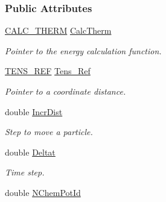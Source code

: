 \subsubsection*{Public Attributes}
\begin{DoxyCompactItemize}
\item 
\hyperlink{classForces_a287767d0d121df9d18211f05b84b692d}{C\+A\+L\+C\+\_\+\+T\+H\+E\+RM} \hyperlink{classForces_ad70e5d3740ce86208f93f64c134cd67a}{Calc\+Therm}\hypertarget{classForces_ad70e5d3740ce86208f93f64c134cd67a}{}\label{classForces_ad70e5d3740ce86208f93f64c134cd67a}

\begin{DoxyCompactList}\small\item\em Pointer to the energy calculation function. \end{DoxyCompactList}\item 
\hyperlink{classForces_a6a793e08866e28de487e8de0b0dd6cb6}{T\+E\+N\+S\+\_\+\+R\+EF} \hyperlink{classForces_ac399a421f2e2ac8c1af8b456ce4d6e5c}{Tens\+\_\+\+Ref}\hypertarget{classForces_ac399a421f2e2ac8c1af8b456ce4d6e5c}{}\label{classForces_ac399a421f2e2ac8c1af8b456ce4d6e5c}

\begin{DoxyCompactList}\small\item\em Pointer to a coordinate distance. \end{DoxyCompactList}\item 
double \hyperlink{classForces_a3849139567c198e89d67104e61a42b79}{Incr\+Dist}\hypertarget{classForces_a3849139567c198e89d67104e61a42b79}{}\label{classForces_a3849139567c198e89d67104e61a42b79}

\begin{DoxyCompactList}\small\item\em Step to move a particle. \end{DoxyCompactList}\item 
double \hyperlink{classForces_ac321dc561843cb5d3f74604036a3a8da}{Deltat}\hypertarget{classForces_ac321dc561843cb5d3f74604036a3a8da}{}\label{classForces_ac321dc561843cb5d3f74604036a3a8da}

\begin{DoxyCompactList}\small\item\em Time step. \end{DoxyCompactList}\item 
double \hyperlink{classForces_a1e6e0ae467497e3c8ed1e1cc017e74b9}{N\+Chem\+Pot\+Id}\hypertarget{classForces_a1e6e0ae467497e3c8ed1e1cc017e74b9}{}\label{classForces_a1e6e0ae467497e3c8ed1e1cc017e74b9}


\end{DoxyCompactItemize}
